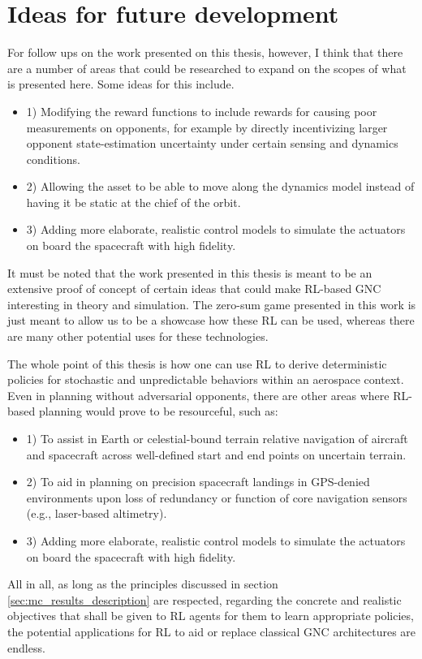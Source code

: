 \section{Ideas for future development}
\label{sec:future-development}

For follow ups on the work presented on this thesis, however, I think that there are a number of areas that could be  researched to expand on the scopes of what is presented here. Some ideas for this include.

\begin{itemize}

    \item 1) Modifying the reward functions to include rewards for causing poor measurements on opponents, for example by directly incentivizing larger opponent state-estimation uncertainty under certain sensing and dynamics conditions.

    \item 2) Allowing the asset to be able to move along the dynamics model instead of having it be static at the chief of the orbit.

    \item 3) Adding more elaborate, realistic control models to simulate the actuators on board the spacecraft with high fidelity.
\end{itemize}


It must be noted that the work presented in this thesis is meant to be an extensive proof of concept of certain ideas that could make RL-based GNC interesting in theory and simulation. The zero-sum game presented in this work is just meant to allow us to be a showcase how these RL can be used, whereas there are many other potential uses for these technologies.

The whole point of this thesis is how one can use RL to derive deterministic policies for stochastic and unpredictable behaviors within an aerospace context. Even in planning without adversarial opponents, there are other areas where RL-based planning would prove to be resourceful, such as:

\begin{itemize}

    \item 1) To assist in Earth or celestial-bound terrain relative navigation of aircraft and spacecraft across well-defined start and end points on uncertain terrain.
    
    
    \item 2) To aid in planning on precision spacecraft landings in GPS-denied environments upon loss of redundancy or function of core navigation sensors (e.g., laser-based altimetry).

    \item 3) Adding more elaborate, realistic control models to simulate the actuators on board the spacecraft with high fidelity.
\end{itemize}


All in all, as long as the principles discussed in section \ref{sec:mc_results_description} are respected, regarding the concrete and realistic objectives that shall be given to RL agents for them to learn appropriate policies, the potential applications for RL to aid or replace classical GNC architectures are endless.
